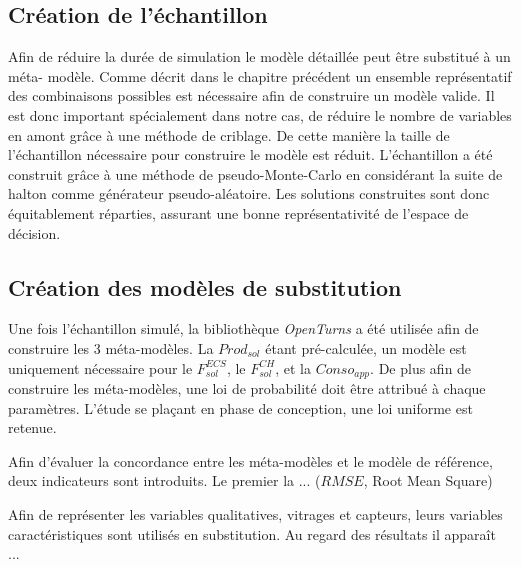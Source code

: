 \subsection{Création de l’échantillon} %
\label{sub:creation_de_l_echantillon}
Afin de réduire la durée de simulation le modèle détaillée peut être substitué à un méta-
modèle. Comme décrit dans le chapitre précédent un ensemble représentatif des combinaisons
possibles est nécessaire afin de construire un modèle valide. Il est donc important
spécialement dans notre cas, de réduire le nombre de variables en amont grâce à une méthode
de criblage. De cette manière la taille de l’échantillon nécessaire pour construire le
modèle est réduit. L’échantillon a été construit grâce à une méthode de pseudo-Monte-Carlo
en considérant la suite de halton comme générateur pseudo-aléatoire. Les solutions construites
sont donc équitablement réparties, assurant une bonne représentativité de l’espace de décision.

\subsection{Création des modèles de substitution} %
\label{sub:creation_des_modeles_de_substitution}
Une fois l’échantillon simulé, la bibliothèque \textit{OpenTurns} a été utilisée
afin de construire les \num{3} méta-modèles. La $Prod_{sol}$ étant pré-calculée,
un modèle est uniquement nécessaire pour le $F_{sol}^{ECS}$, le $F_{sol}^{CH}$, et la $Conso_{app}$.
De plus afin de construire les méta-modèles, une loi de probabilité doit être attribué à chaque
paramètres. L’étude se plaçant en phase de conception, une loi uniforme est retenue.


Afin d’évaluer la concordance entre les méta-modèles et le modèle de référence,
deux indicateurs sont introduits. Le premier la ... ($RMSE$, Root Mean Square)

Afin de représenter les variables qualitatives, vitrages et capteurs, leurs variables
caractéristiques sont utilisés en substitution. Au regard des résultats il apparaît ...




